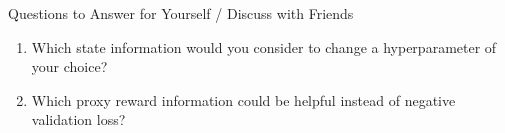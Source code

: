 \begin{frame}[c]{Questions to Answer for Yourself / Discuss with Friends}
    
    \begin{enumerate}
        \item Which state information would you consider to change a hyperparameter of your choice?
        \item Which proxy reward information could be helpful instead of negative validation loss?
    \end{enumerate}
    
\end{frame}

